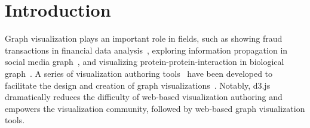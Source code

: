 \section{Introduction}

Graph visualization plays an important role in  fields, such as showing fraud transactions in financial data analysis~\cite{DBLP:journals/tvcg/ChenGHPNXZ19}, exploring information propagation in social media graph~\cite{DBLP:conf/candt/SmithSMRBDCPG09}, and visualizing protein-protein-interaction in biological graph~\cite{doncheva2012topological}.
A series of visualization authoring tools~\cite{satyanarayan2014declarative,mendez2016ivolver,kim2016data} have been developed to facilitate the design and creation of graph visualizations~\cite{lu2020illustrating,lyra,lyra2}. Notably, d3.js~\cite{DBLP:journals/tvcg/BostockOH11} dramatically reduces the difficulty of web-based visualization authoring and empowers the visualization community, followed by  web-based graph visualization tools. 



